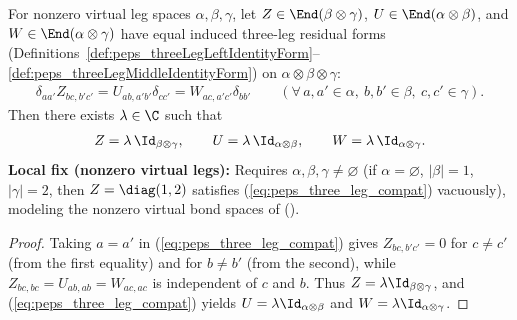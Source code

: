 \begin{lemma}%
    \label{thm:peps_twoInjectiveGaugeScalarReduction}
    \leanok
    For nonzero virtual leg spaces $\alpha,\beta,\gamma$, let
    $Z\in\End(\beta\otimes\gamma)$, $U\in\End(\alpha\otimes\beta)$, and
    $W\in\End(\alpha\otimes\gamma)$ have equal induced three-leg residual forms
    (Definitions~\ref{def:peps_threeLegLeftIdentityForm}--\ref{def:peps_threeLegMiddleIdentityForm})
    on $\alpha\otimes\beta\otimes\gamma$:
    \begin{align}
        \delta_{aa'}Z_{bc,b'c'} = U_{ab,a'b'}\delta_{cc'} = W_{ac,a'c'}\delta_{bb'}
        \qquad (\forall\,a,a'\in\alpha,\ b,b'\in\beta,\ c,c'\in\gamma).
        \label{eq:peps_three_leg_compat}
    \end{align}
    Then there exists $\lambda\in\C$ such that
    \begin{align}
        Z = \lambda\,\Id_{\beta\otimes\gamma}, \qquad
        U = \lambda\,\Id_{\alpha\otimes\beta}, \qquad
        W = \lambda\,\Id_{\alpha\otimes\gamma}. \notag
    \end{align}
    \textbf{Local fix (nonzero virtual legs):}
    Requires $\alpha,\beta,\gamma\neq\varnothing$ (if $\alpha=\varnothing$,
    $|\beta|=1$, $|\gamma|=2$, then $Z=\diag(1,2)$ satisfies
    (\ref{eq:peps_three_leg_compat}) vacuously), modeling the nonzero virtual
    bond spaces of \cite[Section~3]{Molnar2018NormalPEPS}
    (\cite{gap:peps_injective_ft_section3_route}).
\end{lemma}
\begin{proof}\leanok
    Taking $a=a'$ in (\ref{eq:peps_three_leg_compat}) gives $Z_{bc,b'c'}=0$ for
    $c\neq c'$ (from the first equality) and for $b\neq b'$ (from the second),
    while $Z_{bc,bc}=U_{ab,ab}=W_{ac,ac}$ is independent of $c$ and $b$. Thus
    $Z=\lambda\Id_{\beta\otimes\gamma}$, and (\ref{eq:peps_three_leg_compat})
    yields $U=\lambda\Id_{\alpha\otimes\beta}$ and
    $W=\lambda\Id_{\alpha\otimes\gamma}$.
\end{proof}

